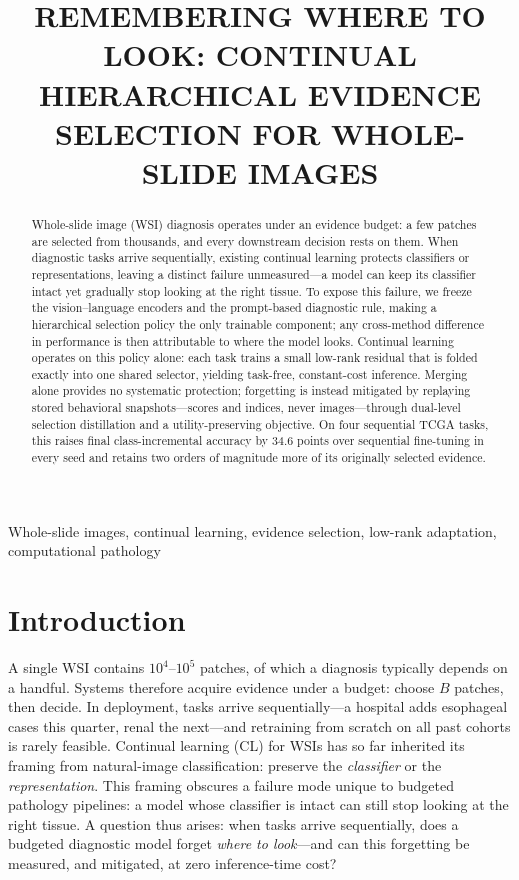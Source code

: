 \documentclass{article}
\title{REMEMBERING WHERE TO LOOK: CONTINUAL HIERARCHICAL EVIDENCE SELECTION FOR WHOLE-SLIDE IMAGES}
\begin{document}
\ninept %
%
\maketitle
%
\begin{abstract}
Whole-slide image (WSI) diagnosis operates under an evidence budget: a few patches are selected from thousands, and every downstream decision rests on them. When diagnostic tasks arrive sequentially, existing continual learning protects classifiers or representations, leaving a distinct failure unmeasured---a model can keep its classifier intact yet gradually stop looking at the right tissue. To expose this failure, we freeze the vision--language encoders and the prompt-based diagnostic rule, making a hierarchical selection policy the only trainable component; any cross-method difference in performance is then attributable to where the model looks. Continual learning operates on this policy alone: each task trains a small low-rank residual that is folded exactly into one shared selector, yielding task-free, constant-cost inference. Merging alone provides no systematic protection; forgetting is instead mitigated by replaying stored behavioral snapshots---scores and indices, never images---through dual-level selection distillation and a utility-preserving objective. On four sequential TCGA tasks, this raises final class-incremental accuracy by 34.6 points over sequential fine-tuning in every seed and retains two orders of magnitude more of its originally selected evidence.
\end{abstract}
%
\begin{keywords}
Whole-slide images, continual learning, evidence selection, low-rank adaptation, computational pathology
\end{keywords}
%
\section{Introduction}
\label{sec:intro}
A single WSI contains $10^4$--$10^5$ patches, of which a diagnosis typically depends on a handful. Systems therefore acquire evidence under a budget: choose $B$ patches, then decide. In deployment, tasks arrive sequentially---a hospital adds esophageal cases this quarter, renal the next---and retraining from scratch on all past cohorts is rarely feasible. Continual learning (CL) for WSIs has so far inherited its framing from natural-image classification: preserve the \emph{classifier} or the \emph{representation}. This framing obscures a failure mode unique to budgeted pathology pipelines: a model whose classifier is intact can still stop looking at the right tissue. A question thus arises: when tasks arrive sequentially, does a budgeted diagnostic model forget \emph{where to look}---and can this forgetting be measured, and mitigated, at zero inference-time cost?
\end{document}
